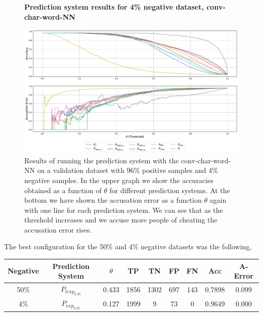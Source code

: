 \begin{figure}
    \centering
    \textbf{Prediction system results for 4\% negative dataset, \gls{conv-char-word-NN}}\par\medskip
    \includegraphics[scale=0.33]{./pictures/experiments/conv_char_word_nn/prediction_system_04}
    \caption{Results of running the prediction system with the
        \gls{conv-char-word-NN} on a validation dataset with 96\% positive
        samples and 4\% negative samples. In the upper graph we show the
        accuracies obtained as a function of $\theta$ for different prediction
        systems. At the bottom we have shown the accusation error as a function
        $\theta$ again with one line for each prediction system. We can see that
        as the threshold increases and we accuse more people of cheating the
        accusation error rises.}
    \label{fig:conv-char-word-NN-pred-4}
\end{figure}

The best configuration for the 50\% and 4\% negative datasets was the
following,

\begin{center}
    \begin{adjustbox}{center}
    \begin{tabular}{|c|c|c|c|c|c|c|c|c|}
        \hline
        Negative  & Prediction System & $\theta$ & TP   & TN   & FP  & FN  &
        Acc       & A-Error
        \\ \hline
        50\%      & $P_{lexp_{0.25}}$ & 0.433    & 1856 & 1302 & 697 & 143 &
        0.7898    & 0.099
        \\ \hline
        4\%       & $P_{exp_{0.25}}$  & 0.127    & 1999 & 9    & 73  & 0   &
        0.9649    & 0.000
        \\ \hline
    \end{tabular}
    \end{adjustbox}
\end{center}


